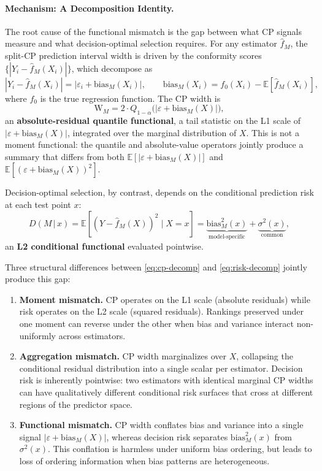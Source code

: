 \documentclass[a4paper,11pt]{article}
\begin{document}
\paragraph{Mechanism: A Decomposition Identity.}
The root cause of the functional mismatch is the gap between what CP signals measure and what decision-optimal selection requires. For any estimator $\hat{f}_M$, the split-CP prediction interval width is driven by the conformity scores $\{|Y_i - \hat{f}_M(X_i)|\}$, which decompose as
\begin{equation}
    |Y_i - \hat{f}_M(X_i)| = |\varepsilon_i + \text{bias}_M(X_i)|,
    \qquad \text{bias}_M(X_i) = f_0(X_i) - \mathbb{E}[\hat{f}_M(X_i)],
\end{equation}
where $f_0$ is the true regression function. The CP width is
\begin{equation}
    \text{W}_M = 2 \cdot Q_{1-\alpha}\bigl(|\varepsilon + \text{bias}_M(X)|\bigr),
    \label{eq:cp-decomp}
\end{equation}
an \textbf{absolute-residual quantile functional}, a tail statistic on the L1 scale of $|\varepsilon + \text{bias}_M(X)|$, integrated over the marginal distribution of $X$. This is not a moment functional: the quantile and absolute-value operators jointly produce a summary that differs from both $\mathbb{E}[|\varepsilon + \text{bias}_M(X)|]$ and $\mathbb{E}[(\varepsilon + \text{bias}_M(X))^2]$.

Decision-optimal selection, by contrast, depends on the conditional prediction risk at each test point $x$:
\begin{equation}
    D(M \,|\, x) = \mathbb{E}[(Y - \hat{f}_M(X))^2 \mid X = x] = \underbrace{\text{bias}_M^2(x)}_{\text{model-specific}} + \underbrace{\sigma^2(x)}_{\text{common}},
    \label{eq:risk-decomp}
\end{equation}
an \textbf{L2 conditional functional} evaluated pointwise.

Three structural differences between \eqref{eq:cp-decomp} and \eqref{eq:risk-decomp} jointly produce this gap:
\begin{enumerate}
    \item \textbf{Moment mismatch.} CP operates on the L1 scale (absolute residuals) while risk operates on the L2 scale (squared residuals). Rankings preserved under one moment can reverse under the other when bias and variance interact non-uniformly across estimators.
    \item \textbf{Aggregation mismatch.} CP width marginalizes over $X$, collapsing the conditional residual distribution into a single scalar per estimator. Decision risk is inherently pointwise: two estimators with identical marginal CP widths can have qualitatively different conditional risk surfaces that cross at different regions of the predictor space.
    \item \textbf{Functional mismatch.} CP width conflates bias and variance into a single signal $|\varepsilon + \text{bias}_M(X)|$, whereas decision risk separates $\text{bias}_M^2(x)$ from $\sigma^2(x)$. This conflation is harmless under uniform bias ordering, but leads to loss of ordering information when bias patterns are heterogeneous.
\end{enumerate}
\end{document}
